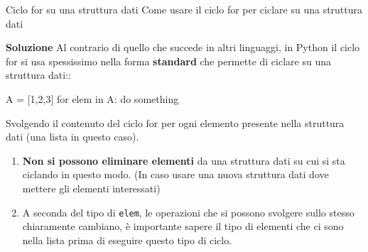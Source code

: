 \documentclass[10pt]{article}
\makeatletter
\newcommand{\<}{\langle}
\renewcommand{\>}{\rangle}
\renewenvironment{proof}[1][\proofname] {\par\pushQED{\qed}
\renewcommand*{\proofname}{Soluzione}
{\normalfont\sffamily\bfseries\topsep6\p@\@plus6\p@\relax #1\@addpunct{.} }}{\popQED\endtrivlist\@endpefalse}
\theoremstyle{mystyle}{\newtheorem*{remark}{Nota}}
\theoremstyle{mystyle}{\newtheorem*{remarks}{Note}}
\theoremstyle{mystyle}{\newtheorem*{example}{Esempio}}
\theoremstyle{mystyle}{\newtheorem*{examples}{Esempi}}
\theoremstyle{definition}{\newtheorem*{exercise}{Exercise}}
\theoremstyle{warn}
\makeatother
\begin{document}
\begin{definition}{Ciclo for su una struttura dati}{}
Come usare il ciclo for per ciclare su una struttura dati
\end{definition}
\begin{proof}
Al contrario di quello che succede in altri linguaggi, in Python il ciclo for si usa spessissimo nella forma \textbf{standard} che permette di ciclare su una struttura dati::
\begin{python}
A = [1,2,3]
for elem in A:
    do something
\end{python}
Svolgendo il contenuto del ciclo for per ogni elemento presente nella struttura dati (una lista in questo caso).
\end{proof}
\begin{remarks} \leavevmode
\begin{enumerate}
    \item \textbf{Non si possono eliminare elementi} da una struttura dati su cui si sta ciclando in questo modo. (In caso usare una nuova struttura dati dove mettere gli elementi interessati)
    \item A seconda del tipo di \texttt{elem}, le operazioni che si possono svolgere sullo stesso chiaramente cambiano, è importante sapere il tipo di elementi che ci sono nella lista prima di eseguire questo tipo di ciclo.
\end{enumerate}
\end{remarks}
\end{document}
